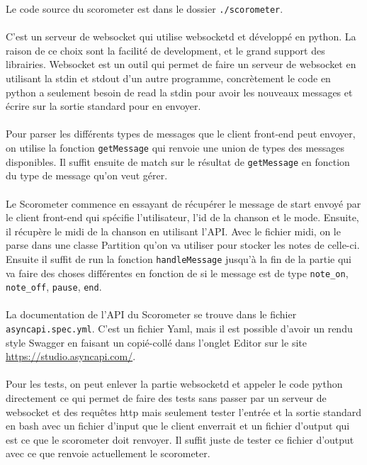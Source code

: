 Le code source du scorometer est dans le dossier \texttt{./scorometer}.
\\\\
C’est un serveur de websocket qui utilise websocketd et développé en python. La raison de ce choix sont la facilité de development, et le grand support des librairies. 
Websocket est un outil qui permet de faire un serveur de websocket en utilisant la stdin et stdout d’un autre programme, concrètement le code en python a seulement besoin de read la stdin pour avoir les nouveaux messages et écrire sur la sortie standard pour en envoyer.
\\\\
Pour parser les différents types de messages que le client front-end peut envoyer, on utilise la fonction \texttt{getMessage} qui renvoie une union de types des messages disponibles. Il suffit ensuite de match sur le résultat de \texttt{getMessage} en fonction du type de message qu’on veut gérer.
\\\\
Le Scorometer commence en essayant de récupérer le message de start envoyé par le client front-end qui spécifie l’utilisateur, l’id de la chanson et le mode. Ensuite, il récupère le midi de la chanson en utilisant l’API. Avec le fichier midi, on le parse dans une classe Partition qu’on va utiliser pour stocker les notes de celle-ci. Ensuite il suffit de run la fonction \texttt{handleMessage} jusqu'à la fin de la partie qui va faire des choses différentes en fonction de si le message est de type \verb|note_on|, \verb|note_off|, \verb|pause|, \verb|end|.
\\\\
La documentation de l’API du Scorometer se trouve dans le fichier \verb|asyncapi.spec.yml|. C’est un fichier Yaml, mais il est possible d’avoir un rendu style Swagger en faisant un copié-collé dans l'onglet Editor sur le site \url{https://studio.asyncapi.com/}.
\\\\
Pour les tests, on peut enlever la partie websocketd et appeler le code python directement ce qui permet de faire des tests sans passer par un serveur de websocket et des requêtes http mais seulement tester l'entrée et la sortie standard en bash avec un fichier d’input que le client enverrait et un fichier d’output qui est ce que le scorometer doit renvoyer. Il suffit juste de tester ce fichier d’output avec ce que renvoie actuellement le scorometer.
